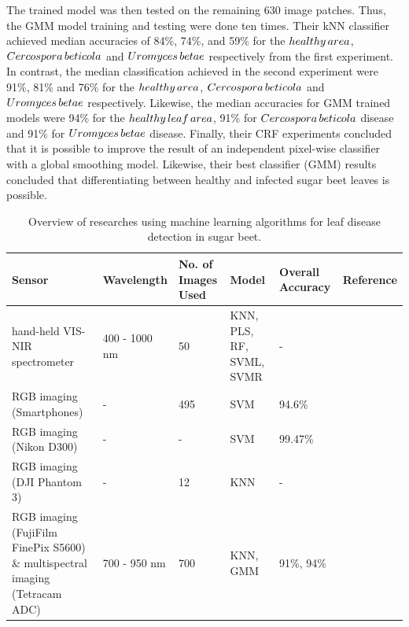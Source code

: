 \begin{enumerate}
The trained model was then tested on the remaining 630 image patches. Thus, the GMM model training and testing were done ten times. Their kNN classifier achieved median accuracies of 84\%, 74\%, and 59\% for the $healthy \thinspace area$, $Cercospora \thinspace beticola$ and $Uromyces \thinspace betae$ respectively from the first experiment. In contrast, the median classification achieved in the second experiment were 91\%, 81\% and 76\% for the $healthy \thinspace area$, $Cercospora \thinspace beticola$ and $Uromyces \thinspace betae$ respectively. Likewise, the median accuracies for GMM trained models were 94\% for the $healthy \thinspace leaf \thinspace area$, 91\% for $Cercospora \thinspace beticola$ disease and 91\% for $Uromyces \thinspace betae$ disease. Finally, their CRF experiments concluded that it is possible to improve the result of an independent pixel-wise classifier with a global smoothing model. Likewise, their best classifier (GMM) results concluded that differentiating between healthy and infected sugar beet leaves is possible.
\end{enumerate}

\begin{table}[h!]
\centering 
 \begin{tabular}{p{2cm}|p{2cm}|p{2cm}|p{2cm}|p{2cm}|p{2cm}} 
 \hline
  Sensor & Wavelength & No. of Images Used & Model & Overall Accuracy & Reference\\ [0.5ex] 
 \hline\hline
 hand-held VIS-NIR spectrometer & 400 - 1000 nm & 50 & KNN, PLS, RF, SVML, SVMR & -  & \cite{Barreto2020HyperspectralIO} \\ 
 \hline
 RGB imaging (Smartphones) & - & 495 & SVM & 94.6\% & \cite{hallau2018automated} \\ 
 \hline
 RGB imaging (Nikon D300) & - & - & SVM & 99.47\% & \cite{zhou2013early} \\ 
 \hline
  RGB imaging (DJI Phantom 3) & - & 12 & KNN & - & \cite{ziya34determination} \\ 
 \hline
  RGB imaging (FujiFilm FinePix S5600) \& multispectral imaging (Tetracam ADC) & 700 - 950 nm & 700 & KNN, GMM & 91\%, 94\% & \cite{bauer2011potential} \\ 
 \hline

 \end{tabular}
 \caption{Overview of researches using machine learning algorithms for leaf disease detection in sugar beet.}
 \label{table:3}
\end{table}

